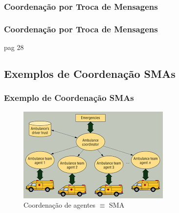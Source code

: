 \subsubsection{Coordenação por Troca de Mensagens}

\begin{frame}
\frametitle{Coordenação por Troca de Mensagens}

pag 28


\end{frame}




\subsection{Exemplos de Coordenação SMAs}

\begin{frame}
\frametitle{Exemplo de Coordenação SMAs}

\begin{figure}[!ht]
\centering
\includegraphics[height =.6\textheight,width=.7\textwidth]{figuras/coordenacao_agentes01.png}
\caption{Coordenação de agentes $\equiv $   SMA}
\end{figure}
 \end{frame}


